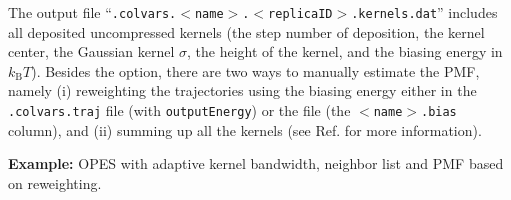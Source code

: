 The output file ``\outputName\texttt{.colvars.$<$name$>$.$<$replicaID$>$.kernels.dat}'' includes all deposited uncompressed kernels (the step number of deposition, the kernel center, the Gaussian kernel $\sigma$, the height of the kernel, and the biasing energy in $k_{\mathrm{B}} T$). Besides the  option, there are two ways to manually estimate the PMF, namely (i) reweighting the trajectories using the biasing energy either in the \texttt{.colvars.traj} file (with \texttt{outputEnergy}) or the  file (the \texttt{$<$name$>$.bias} column), and (ii) summing up all the kernels (see Ref.\cite{Invernizzi2020} for more information).


\noindent\textbf{Example:} OPES with adaptive kernel bandwidth, neighbor list and PMF based on reweighting.\\

